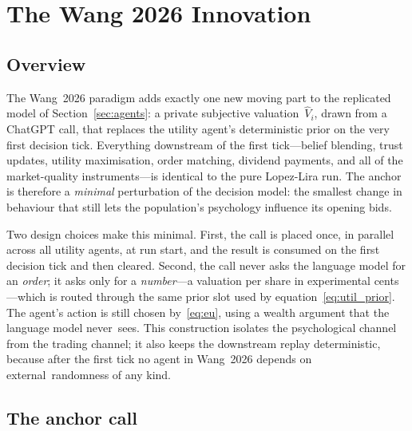 \section{The Wang 2026 Innovation}
\label{sec:innovation}

\subsection{Overview}

The Wang~2026 paradigm adds exactly one new moving part to the
replicated model of Section~\ref{sec:agents}: a private subjective
valuation~$\hat{V}_i$, drawn from a ChatGPT call, that replaces the
utility agent's deterministic prior on the very first decision
tick. Everything downstream of the first tick---belief blending,
trust updates, utility maximisation, order matching, dividend
payments, and all of the market-quality instruments---is identical
to the pure Lopez-Lira run. The anchor is therefore a \emph{minimal}
perturbation of the decision model: the smallest change in
behaviour that still lets the population's psychology influence
its opening bids.

Two design choices make this minimal. First, the call is placed
once, in parallel across all utility agents, at run start, and the
result is consumed on the first decision tick and then cleared.
Second, the call never asks the language model for an \emph{order};
it asks only for a \emph{number}---a valuation per share in
experimental cents---which is routed through the same prior slot
used by equation~\eqref{eq:util_prior}. The agent's action is still
chosen by~\eqref{eq:eu}, using a wealth argument that the language
model never~sees. This construction isolates the psychological
channel from the trading channel; it also keeps the downstream
replay deterministic, because after the first tick no agent in
Wang~2026 depends on external~randomness of any kind.

\subsection{The anchor call}

